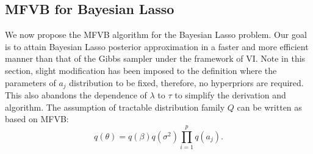 \subsection{MFVB for Bayesian Lasso}
We now propose the MFVB algorithm for the Bayesian Lasso problem. Our goal is to attain Bayesian Lasso posterior approximation in a faster and more efficient manner than that of the Gibbs sampler under the framework of VI. Note in this section, slight modification has been imposed to the definition where the parameters of $a_j$ distribution to be fixed, therefore, no hyperpriors are required. This also abandons the dependence of $\lambda$ to $\tau$ to simplify the derivation and algorithm. The assumption of tractable distribution family $Q$ can be written as based on MFVB:
\begin{equation}
	q(\theta) = q(\beta)q(\sigma^2)\prod_{i=1}^p q(a_j).
\end{equation}
